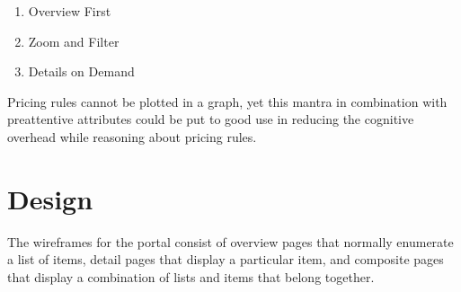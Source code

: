 \begin{enumerate}
	\item Overview First
	\item Zoom and Filter
	\item Details on Demand
\end{enumerate}

Pricing rules cannot be plotted in a graph, yet this mantra in combination with preattentive attributes could be put to good use in reducing the cognitive overhead while reasoning about pricing rules.

\section{Design}
The wireframes for the portal consist of overview pages that normally enumerate a list of items, detail pages that display a particular item, and composite pages that display a combination of lists and items that belong together.




